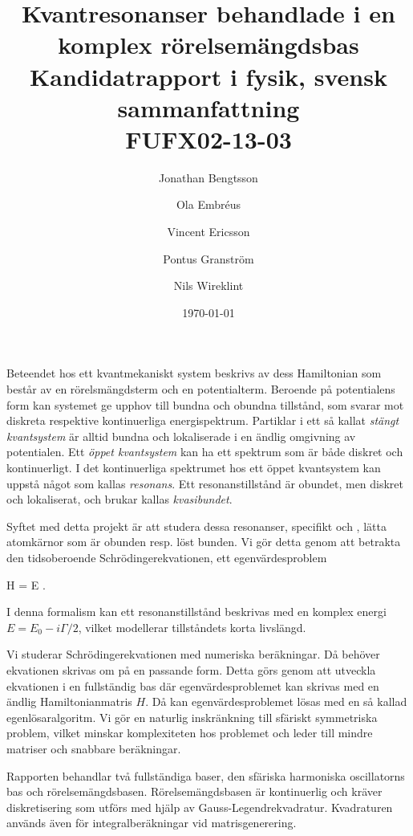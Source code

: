 \documentclass[12pt,a4paper]{article}
\begin{document}
  


\title{Kvantresonanser behandlade i en\\ komplex rörelsemängdsbas \\ 
\Large Kandidatrapport i fysik, svensk sammanfattning\\
FUFX02-13-03}
\author{Jonathan Bengtsson \and Ola Embréus \and Vincent Ericsson \and Pontus Granström \and Nils Wireklint}
\date{\today}
\maketitle
\newpage


Beteendet hos ett kvantmekaniskt system beskrivs av dess Hamiltonian som består av en rörelsmängdsterm och en potentialterm.
Beroende på potentialens form kan systemet ge upphov till bundna och obundna tillstånd, som svarar mot diskreta respektive kontinuerliga energispektrum.
Partiklar i ett så kallat \emph{stängt kvantsystem} är alltid bundna och lokaliserade i en ändlig omgivning av potentialen. 
Ett \emph{öppet kvantsystem} kan ha ett spektrum som är både diskret och kontinuerligt.
I det kontinuerliga spektrumet hos ett öppet kvantsystem kan uppstå något som kallas \emph{resonans}.
Ett resonanstillstånd är obundet, men diskret och lokaliserat, och brukar kallas \emph{kvasibundet}.

Syftet med detta projekt är att studera dessa resonanser, specifikt  och , lätta atomkärnor som är obunden resp. löst bunden.
Vi gör detta genom att betrakta den tidsoberoende Schrödingerekvationen, ett egenvärdesproblem
\begin{eq*}
  H \ket\psi = E \ket\psi.
\end{eq*}
I denna formalism kan ett resonanstillstånd beskrivas med en komplex energi $E = E_0 - i\Gamma/2$, vilket modellerar tillståndets korta livslängd.

Vi studerar Schrödingerekvationen med numeriska beräkningar. Då behöver ekvationen skrivas om på en passande form.
Detta görs genom att utveckla ekvationen i en fullständig bas där egenvärdesproblemet kan skrivas med en ändlig Hamiltonianmatris $H$. 
Då kan egenvärdesproblemet lösas med en så kallad egenlösaralgoritm.
Vi gör en naturlig inskränkning till sfäriskt symmetriska problem, vilket minskar komplexiteten hos problemet och leder till mindre matriser och snabbare beräkningar.

Rapporten behandlar två fullständiga baser, den sfäriska harmoniska oscillatorns bas och rörelsemängdsbasen. 
Rörelsemängdsbasen är kontinuerlig och kräver diskretisering som utförs med hjälp av Gauss-Legendrekvadratur. 
Kvadraturen används även för integralberäkningar vid matrisgenerering.
\end{document}
